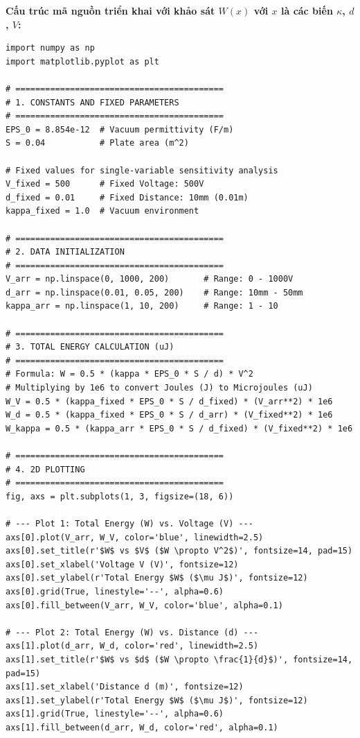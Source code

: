 \textbf{Cấu trúc mã nguồn triển khai với khảo sát $W(x)$ với $x$ là các biến $\kappa$, $d$, $V$:}
\begin{lstlisting}[style=pythonstyle, caption={Đoạn code 2D tính tổng năng lượng (W)}]
import numpy as np
import matplotlib.pyplot as plt

# ==========================================
# 1. CONSTANTS AND FIXED PARAMETERS
# ==========================================
EPS_0 = 8.854e-12  # Vacuum permittivity (F/m)
S = 0.04           # Plate area (m^2)

# Fixed values for single-variable sensitivity analysis
V_fixed = 500      # Fixed Voltage: 500V
d_fixed = 0.01     # Fixed Distance: 10mm (0.01m)
kappa_fixed = 1.0  # Vacuum environment

# ==========================================
# 2. DATA INITIALIZATION
# ==========================================
V_arr = np.linspace(0, 1000, 200)       # Range: 0 - 1000V
d_arr = np.linspace(0.01, 0.05, 200)    # Range: 10mm - 50mm
kappa_arr = np.linspace(1, 10, 200)     # Range: 1 - 10

# ==========================================
# 3. TOTAL ENERGY CALCULATION (uJ)
# ==========================================
# Formula: W = 0.5 * (kappa * EPS_0 * S / d) * V^2
# Multiplying by 1e6 to convert Joules (J) to Microjoules (uJ)
W_V = 0.5 * (kappa_fixed * EPS_0 * S / d_fixed) * (V_arr**2) * 1e6
W_d = 0.5 * (kappa_fixed * EPS_0 * S / d_arr) * (V_fixed**2) * 1e6
W_kappa = 0.5 * (kappa_arr * EPS_0 * S / d_fixed) * (V_fixed**2) * 1e6

# ==========================================
# 4. 2D PLOTTING
# ==========================================
fig, axs = plt.subplots(1, 3, figsize=(18, 6))

# --- Plot 1: Total Energy (W) vs. Voltage (V) ---
axs[0].plot(V_arr, W_V, color='blue', linewidth=2.5)
axs[0].set_title(r'$W$ vs $V$ ($W \propto V^2$)', fontsize=14, pad=15)
axs[0].set_xlabel('Voltage V (V)', fontsize=12)
axs[0].set_ylabel(r'Total Energy $W$ ($\mu J$)', fontsize=12)
axs[0].grid(True, linestyle='--', alpha=0.6)
axs[0].fill_between(V_arr, W_V, color='blue', alpha=0.1)

# --- Plot 2: Total Energy (W) vs. Distance (d) ---
axs[1].plot(d_arr, W_d, color='red', linewidth=2.5)
axs[1].set_title(r'$W$ vs $d$ ($W \propto \frac{1}{d}$)', fontsize=14, pad=15)
axs[1].set_xlabel('Distance d (m)', fontsize=12)
axs[1].set_ylabel(r'Total Energy $W$ ($\mu J$)', fontsize=12)
axs[1].grid(True, linestyle='--', alpha=0.6)
axs[1].fill_between(d_arr, W_d, color='red', alpha=0.1)


\end{lstlisting}
